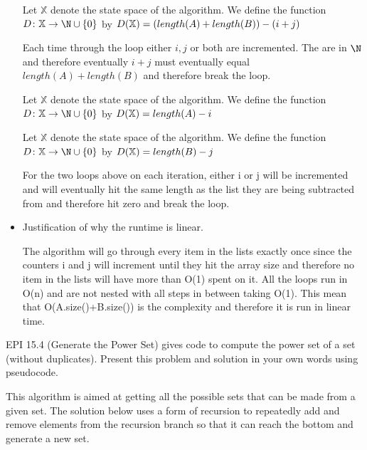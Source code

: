 \documentclass{article}
\begin{document}
\begin{itemize}
 Let $\mathbb{X}$ denote the state space of the algorithm. We define the function $D \colon \mathbb{X} \to \N \cup \{0\}$ by $D( \mathbb{X}) = ( length(A) + length(B) )-(i + j)\newline$
    
    Each time through the loop either $i,j$ or both are incremented. The are in $\N$ and therefore eventually $i + j$ must eventually equal $ length(A) + length(B) $ and therefore break the loop.

    Let $\mathbb{X}$ denote the state space of the algorithm. We define the function $D \colon \mathbb{X} \to \N \cup \{0\}$ by $D( \mathbb{X}) =  length(A) - i\newline $

    Let $\mathbb{X}$ denote the state space of the algorithm. We define the function $D \colon \mathbb{X} \to \N \cup \{0\}$ by $D( \mathbb{X}) =  length(B) - j\newline$
    
    For the two loops above on each iteration, either i or j will be incremented and will eventually hit the same length as the list they are being subtracted from and therefore hit zero and break the loop.
    
   

    
    \item Justification of why the runtime is linear.
    
        The algorithm will go through every item in the lists exactly once since the counters i and j will increment until they hit the array size and therefore no item in the lists will have more than O(1) spent on it. All the loops run in O(n) and are not nested with all steps in between taking O(1). This mean that O(A.size()+B.size()) is the complexity and therefore it is run in linear time. 
    
\end{itemize}

\nextprob
EPI 15.4 (Generate the Power Set) gives code to compute the power set of a set
(without duplicates).  Present this problem and solution in your own words using
pseudocode.

This algorithm is aimed at getting all the possible sets that can be made from a given set. The solution below uses a form of recursion to repeatedly add and remove elements from the recursion branch so that it can reach the bottom and generate a new set.
\end{document}
